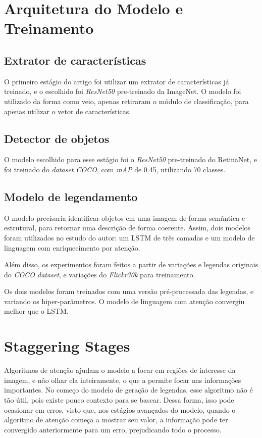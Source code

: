 \documentclass[12pt]{article}
\begin{document}
\section*{Arquitetura do Modelo e Treinamento}

\subsection*{Extrator de características}

O primeiro estágio do artigo foi utilizar um extrator de características já treinado, e o escolhido foi \textit{ResNet50} pre-treinado da ImageNet. O modelo foi utilizado da forma como veio, apenas retiraram o módulo de classificação, para apenas utilizar o vetor de características.

\subsection*{Detector de objetos}

O modelo escolhido para esse estágio foi o \textit{ResNet50} pre-treinado do RetinaNet, e foi treinado do \textit{dataset COCO}, com \textit{mAP} de 0.45, utilizando 70 classes.

\subsection*{Modelo de legendamento}

O modelo precisaria identificar objetos em uma imagem de forma semântica e estrutural, para retornar uma descrição de forma coerente. Assim, dois modelos foram utilizados no estudo do autor: um LSTM de três camadas e um modelo de linguagem com enriquecimento por atenção. 

Além disso, os experimentos foram feitos a partir de variações e legendas originais do \textit{COCO dataset}, e variações do \textit{Flickr30k} para treinamento.

Os dois modelos foram treinados com uma versão pré-processada das legendas, e variando os hiper-parâmetros. O modelo de linguagem com atenção convergiu melhor que o LSTM.%

\section*{Staggering Stages}

Algoritmos de atenção ajudam o modelo a focar em regiões de interesse da imagem, e não olhar ela inteiramente, o que a permite focar nas informações importantes. No começo do modelo de geração de legendas, esse algoritmo não é tão útil, pois existe pouco contexto para se basear. Dessa forma, isso pode ocasionar em erros, visto que, nos estágios avançados do modelo, quando o algoritmo de atenção começa a mostrar seu valor, a informação pode ter convergido anteriormente para um erro, prejudicando todo o processo.
\end{document}
